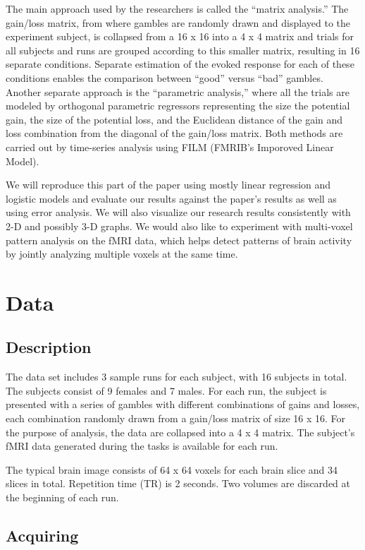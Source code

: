 \documentclass[11pt]{article}
\begin{document}
The main approach used by the researchers is called the ``matrix analysis.''
The gain/loss matrix, from where gambles are randomly drawn and displayed to
the experiment subject, is collapsed from a 16 x 16 into a 4 x 4 matrix and
trials for all subjects and runs are grouped according to this smaller matrix,
resulting in 16 separate conditions. Separate estimation of the evoked response
for each of these conditions enables the comparison between ``good'' versus
``bad'' gambles. Another separate approach is the ``parametric analysis,''
where all the trials are modeled by orthogonal parametric regressors
representing the size the potential gain, the size of the potential loss, and
the Euclidean distance of the gain and loss combination from the diagonal of
the gain/loss matrix. Both methods are carried out by time-series analysis
using FILM (FMRIB’s Imporoved Linear Model).

We will reproduce this part of the paper using mostly linear regression and
logistic models and evaluate our results against the paper’s results as well as
using error analysis. We will also visualize our research results consistently
with 2-D and possibly 3-D graphs. We would also like to experiment with
multi-voxel pattern analysis on the fMRI data, which helps detect patterns of
brain activity by jointly analyzing multiple voxels at the same time. 

\section{Data}

\subsection{Description}

The data set includes 3 sample runs for each subject, with 16 subjects in
total. The subjects consist of 9 females and 7 males. For each run, the subject
is presented with a series of gambles with different combinations of gains and
losses, each combination randomly drawn from a gain/loss matrix of size 16 x
16. For the purpose of analysis, the data are collapsed into a 4 x 4 matrix.
The subject’s fMRI data generated during the tasks is available for each run.

The typical brain image consists of 64 x 64 voxels for each brain slice and 34
slices in total. Repetition time (TR) is 2 seconds. Two volumes are discarded
at the beginning of each run.

\subsection{Acquiring}
\end{document}
